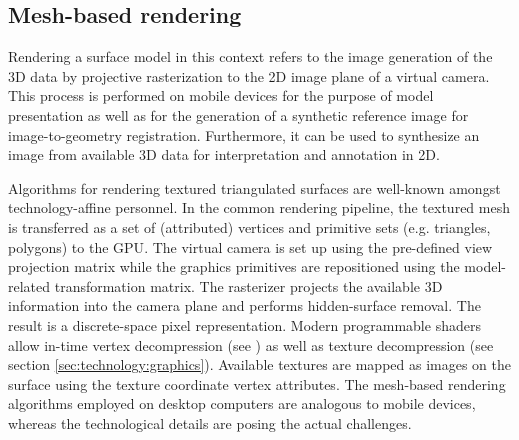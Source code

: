 \documentclass[review]{elsarticle}
\begin{document}

\subsection{Mesh-based rendering}
\label{sec:algorithms:mesh_rendering}

Rendering a surface model in this context refers to the image generation of the 3D data by projective rasterization to the 2D image plane of a virtual camera. This process is performed on mobile devices for the purpose of model presentation as well as for the generation of a synthetic reference image for image-to-geometry registration. Furthermore, it can be used to synthesize an image from available 3D data for interpretation and annotation in 2D.

Algorithms for rendering textured triangulated surfaces are well-known amongst technology-affine personnel. In the common rendering pipeline, the textured mesh is transferred as a set of (attributed) vertices and primitive sets (e.g. triangles, polygons) to the \gls{GPU}. The virtual camera is set up using the pre-defined view projection matrix while the graphics primitives are repositioned using the model-related transformation matrix. The rasterizer projects the available 3D information into the camera plane and performs hidden-surface removal. The result is a discrete-space pixel representation. Modern programmable shaders allow in-time vertex decompression (see \cite{Ponchio2016}) as well as texture decompression (see section \ref{sec:technology:graphics}). Available textures are mapped as images on the surface using the texture coordinate vertex attributes. The mesh-based rendering algorithms employed on desktop computers are analogous to mobile devices, whereas the technological details are posing the actual challenges.
\end{document}
